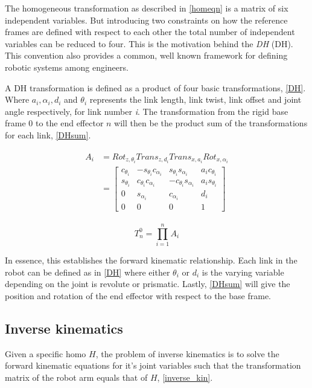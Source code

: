 The homogeneous transformation as described in \eqref{homeqn} is a matrix of six independent variables. But introducing two constraints on how the reference frames are defined with respect to each other the total number of independent variables can be reduced to four. This is the motivation behind the \textit{\gls{DH}} (DH). This convention also provides a common, well known framework for defining robotic systems among engineers.

A DH transformation is defined as a product of four basic transformations, \eqref{DH}. Where $a_i, \alpha_i, d_i $ and $\theta_i$ represents the link length, link twist, link offset and joint angle respectively, for link number \textit{i}. The transformation from the rigid base frame $0$ to the end effector $n$ will then be the product sum of the transformations for each link, \eqref{DHsum}.

\begin{align}\label{DH}
\begin{split}
A_i &= Rot_{z,\theta_i}Trans_{z,d_i}Trans_{x,a_i}Rot_{x,\alpha_i} \\
&= \begin{bmatrix}
c_{\theta_i} & -s_{\theta_i}c_{\alpha_i} & s_{\theta_i}s_{\alpha_i} & a_{i}c_{\theta_i} \\ 
s_{\theta_i} & c_{\theta_i}c_{\alpha_i} & -c_{\theta_i}s_{\alpha_i} & a_{i}s_{\theta_i} \\ 
0 & s_{\alpha_i} & c_{\alpha_i} & d_i \\ 
0 & 0 & 0 & 1 
\end{bmatrix}
\end{split}
\end{align}

\begin{equation}\label{DHsum}
T^0_n=\prod_{i=1}^{n}A_i
\end{equation}

In essence, this establishes the forward kinematic relationship. Each link in the robot can be defined as in \eqref{DH} where either $\theta_i$ or $d_i$ is the varying variable depending on the joint is revolute or prismatic. Lastly, \eqref{DHsum} will give the position and rotation of the end effector with respect to the base frame.

\subsection{Inverse kinematics}

Given a specific \gls{homo} $H$, the problem of inverse kinematics is to solve the forward kinematic equations for it's joint variables such that the transformation matrix of the robot arm equals that of $H$, \eqref{inverse_kin}.

